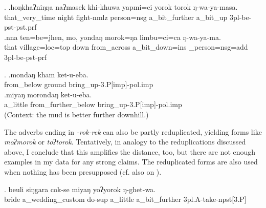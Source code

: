\ex. \ag.hoŋkhaʔniŋŋa   naʔmasek    khi-khuwa          yapmi=ci     yorok      torok      ŋ-wa-ya-masa.\\
that\_very\_time night fight{\sc -nmlz} person{\sc =nsg} a\_bit\_further a\_bit\_up {\sc 3pl-}be{\sc -pst-pst.prf}\\
 
\bg.nna  ten=be=jhen,         mo,   yondaŋ    morok=ŋa       limbu=ci=ca           ŋ-wa-ya-ma.\\
that village{\sc =loc=top} down from\_across a\_bit\_down{\sc =ins} \_person{\sc =nsg=add} {\sc 3pl-}be{\sc -pst-prf}\\
 

\ex. \ag.mondaŋ kham ket-u-eba.\\
from\_below ground bring\_up{\sc -3.P[imp]-pol.imp}\\
\bg.miyaŋ morondaŋ ket-u-eba.\\
a\_little from\_further\_below bring\_up{\sc -3.P[imp]-pol.imp}\\
 (Context: the mud is better further downhill.)

The adverbs ending in \emph{-rok\ti -rek} can also be partly reduplicated, yielding forms like \emph{moʔmorok} or \emph{toʔtorok}. Tentatively, in analogy to the reduplications discussed above, I conclude that this amplifies the distance, too, but there are not enough examples in my data for any strong claims. The reduplicated forms are also  used when nothing has been presupposed (cf. also  on ).
 
\exg.  beuli siŋgara         cok-se         miyaŋ yoʔyorok ŋ-ghet-wa.\\
bride a\_wedding\_custom do{\sc -sup} a\_little a\_bit\_further {\sc 3pl.A-}take{\sc -npst[3.P]}\\
 


